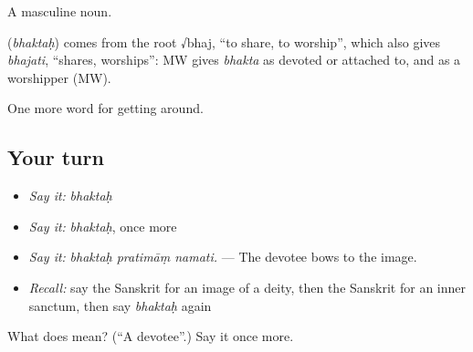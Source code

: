 A masculine noun.

\begin{cousinweb}
\textbf{} (\emph{bhaktaḥ}) comes from the root √bhaj, \textquotedblleft{}to share, to worship\textquotedblright{}, which also gives \emph{bhajati}, \textquotedblleft{}shares, worships\textquotedblright{}: MW gives \emph{bhakta} as devoted or attached to, and as a worshipper (MW).
\end{cousinweb}

\begin{grammarlens}[title={What you've built}]
One more word for getting around.
\end{grammarlens}

\subsection*{Your turn}
\begin{itemize}
\raggedright
  \item \emph{Say it:} \emph{bhaktaḥ}
  \item \emph{Say it:} \emph{bhaktaḥ}, once more
  \item \emph{Say it:} \emph{bhaktaḥ pratimāṃ namati.} — The devotee bows to the image.
  \item \emph{Recall:} say the Sanskrit for an image of a deity, then the Sanskrit for an inner sanctum, then say \emph{bhaktaḥ} again
\end{itemize}

\begin{tcolorbox}[breakable,colback=teal!4,colframe=teal!35!black,title={Before you move on}]
What does  mean? (\textquotedblleft{}A devotee\textquotedblright{}.) Say it once more.
\end{tcolorbox}
